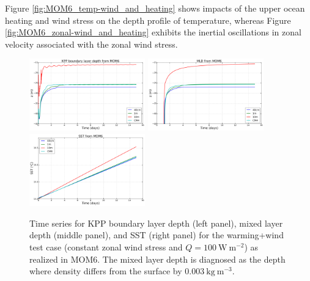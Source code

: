 Figure \ref{fig:MOM6_temp-wind_and_heating} shows impacts of the upper
ocean heating and wind stress on the depth profile of temperature,
whereas Figure \ref{fig:MOM6_zonal-wind_and_heating} exhibits the
inertial oscillations in zonal velocity associated with the zonal wind
stress.  

\begin{figure}[h!t]
\begin{center}
\includegraphics[angle=0,width=5cm]{./figs/MOM6/skin_warming_wind_KPP_MOM6_bldepth.png}
\includegraphics[angle=0,width=5cm]{./figs/MOM6/skin_warming_wind_KPP_MOM6_mld.png}
\includegraphics[angle=0,width=5cm]{./figs/MOM6/skin_warming_wind_KPP_MOM6_SST.png}
\caption[KPP BL depth, ML depth, and SST from MOM6 for warming+winds
test]{\sf Time series for KPP boundary layer depth (left panel), mixed
  layer depth (middle panel), and SST (right panel) for the
  warming+wind test case (constant zonal wind stress and
  $Q=100~\mbox{W}~\mbox{m}^{-2}$) as realized in MOM6.  The mixed
  layer depth is diagnosed as the depth where density differs from the
  surface by $0.003~\mbox{kg}~\mbox{m}^{-3}.$}
\label{fig:MOM6_SST_bldepth-wind_and_heating}
\end{center}
\end{figure}


